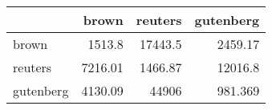\begin{tabular}{lrrr}
\hline
           &   brown &   reuters &   gutenberg \\
\hline
 brown     & 1513.8  &  17443.5  &    2459.17  \\
 reuters   & 7216.01 &   1466.87 &   12016.8   \\
 gutenberg & 4130.09 &  44906    &     981.369 \\
\hline
\end{tabular}